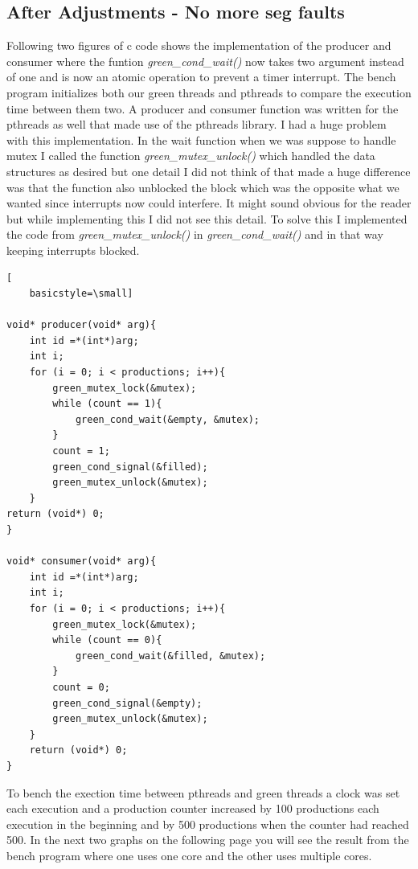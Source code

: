 \documentclass[12pt, letterpaper]{article}
\begin{document}
\subsection{After Adjustments - No more seg faults}
Following two figures of c code shows the implementation of the producer and consumer where the funtion \emph{green{\_}cond{\_}wait()} now takes two argument
instead of one and is now an atomic operation to prevent a timer interrupt. The bench program initializes both our green threads and
pthreads to compare the execution time between them two. A producer and consumer function was written for the pthreads as well that made use of the pthreads library. 
I had a huge problem with this implementation. In the wait function when we was suppose to handle mutex I called the 
function \emph{green{\_}mutex{\_}unlock()} which handled the data structures as desired but one detail I did not think of that made a huge difference was that
the function also unblocked the block which was the opposite what we wanted since interrupts now could interfere. It might sound obvious for the reader but while implementing 
this I did not see this detail. To solve this I implemented the code from \emph{green{\_}mutex{\_}unlock()} in \emph{green{\_}cond{\_}wait()} and in that way keeping interrupts blocked. 


\begin{lstlisting}[
    basicstyle=\small]

void* producer(void* arg){
    int id =*(int*)arg;
    int i;
    for (i = 0; i < productions; i++){
        green_mutex_lock(&mutex);
        while (count == 1){
            green_cond_wait(&empty, &mutex);
        }
        count = 1;
        green_cond_signal(&filled); 
        green_mutex_unlock(&mutex);
    }
return (void*) 0; 
}

void* consumer(void* arg){
    int id =*(int*)arg;
    int i;
    for (i = 0; i < productions; i++){
        green_mutex_lock(&mutex);
        while (count == 0){
            green_cond_wait(&filled, &mutex);
        }
        count = 0;
        green_cond_signal(&empty); 
        green_mutex_unlock(&mutex);
    }
    return (void*) 0; 
}
    \end{lstlisting}

    To bench the exection time between pthreads and green threads a clock was set each execution and a production counter increased by 100
    productions each execution in the beginning and by 500 productions when the counter had reached 500. In the next two graphs on the following page you will see 
    the result from the bench program where one uses one core and the other uses multiple cores. 
\end{document}
